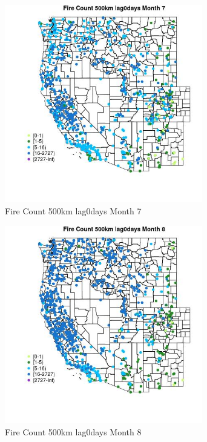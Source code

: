 \begin{figure} 
\centering  
\includegraphics[width=0.77\textwidth]{Code_Outputs/Report_ML_input_PM25_Step4_part_f_de_duplicated_aveswNAs_MapObsMo7Fire_Count_500km_lag0days.jpg} 
\caption{\label{fig:Report_ML_input_PM25_Step4_part_f_de_duplicated_aveswNAsMapObsMo7Fire_Count_500km_lag0days}Fire Count 500km lag0days Month 7} 
\end{figure} 
 

\begin{figure} 
\centering  
\includegraphics[width=0.77\textwidth]{Code_Outputs/Report_ML_input_PM25_Step4_part_f_de_duplicated_aveswNAs_MapObsMo8Fire_Count_500km_lag0days.jpg} 
\caption{\label{fig:Report_ML_input_PM25_Step4_part_f_de_duplicated_aveswNAsMapObsMo8Fire_Count_500km_lag0days}Fire Count 500km lag0days Month 8} 
\end{figure} 
 

